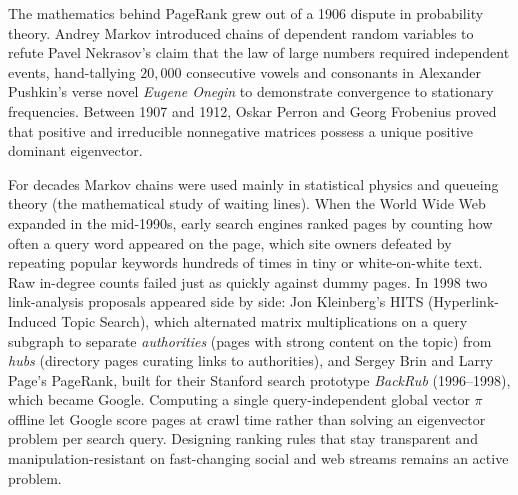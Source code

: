 \begin{historybox}
The mathematics behind PageRank grew out of a 1906 dispute in probability theory. Andrey Markov introduced chains of dependent random variables to refute Pavel Nekrasov's claim that the law of large numbers required independent events, hand-tallying $20{,}000$ consecutive vowels and consonants in Alexander Pushkin's verse novel \emph{Eugene Onegin} to demonstrate convergence to stationary frequencies. Between 1907 and 1912, Oskar Perron and Georg Frobenius proved that positive and irreducible nonnegative matrices possess a unique positive dominant eigenvector.

For decades Markov chains were used mainly in statistical physics and queueing theory (the mathematical study of waiting lines). When the World Wide Web expanded in the mid-1990s, early search engines ranked pages by counting how often a query word appeared on the page, which site owners defeated by repeating popular keywords hundreds of times in tiny or white-on-white text. Raw in-degree counts failed just as quickly against dummy pages. In 1998 two link-analysis proposals appeared side by side: Jon Kleinberg's HITS (Hyperlink-Induced Topic Search), which alternated matrix multiplications on a query subgraph to separate \emph{authorities} (pages with strong content on the topic) from \emph{hubs} (directory pages curating links to authorities), and Sergey Brin and Larry Page's PageRank, built for their Stanford search prototype \emph{BackRub} (1996--1998), which became Google. Computing a single query-independent global vector $\pi$ offline let Google score pages at crawl time rather than solving an eigenvector problem per search query. Designing ranking rules that stay transparent and manipulation-resistant on fast-changing social and web streams remains an active problem.
\end{historybox}

